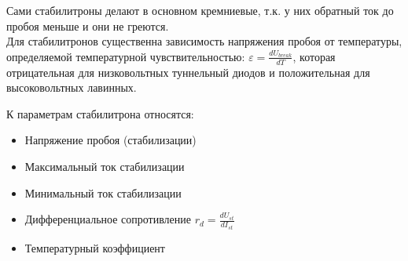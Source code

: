 Сами стабилитроны делают в основном кремниевые, т.к. у них обратный ток до пробоя меньше и они не греются.\\
Для стабилитронов существенна зависимость напряжения пробоя от температуры, определяемой температурной чувствительностью: $\varepsilon = \frac{dU_{break}}{dT}$, которая отрицательная для низковольтных туннельный диодов и положительная для высоковольтных лавинных.

К параметрам стабилитрона относятся:
\begin{itemize}
\item Напряжение пробоя (стабилизации)
\item Максимальный ток стабилизации
\item Минимальный ток стабилизации
\item Дифференциальное сопротивление $r_d = \frac{d U_{st}}{d I_{st}}$
\item Температурный коэффициент 
\end{itemize}
